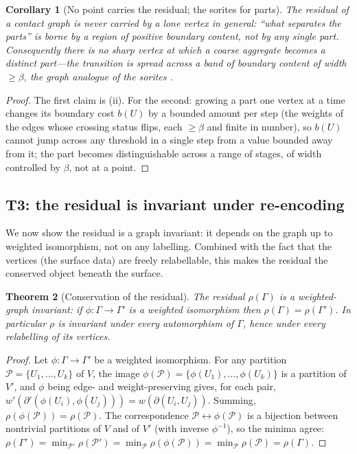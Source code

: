 \documentclass[11pt,a4paper]{article}
\theoremstyle{thmstyle}
\newtheorem{theorem}{Theorem}[section]
\newtheorem{corollary}[theorem]{Corollary}
\theoremstyle{definition}
\theoremstyle{remark}
\newcommand{\Gph}{\Gamma}                 %
\newcommand{\V}{V}                        %
\newcommand{\wt}{w}                       %
\newcommand{\floorc}{\beta}               %
\newcommand{\cut}{\partial}               %
\newcommand{\Res}{\rho}                   %
\begin{document}
\begin{corollary}[No point carries the residual; the sorites for parts]
\label{cor:point-forbidden}
The residual of a contact graph is never carried by a lone vertex in general:
``what separates the parts'' is borne by a region of positive boundary content,
not by any single part. Consequently there is no sharp vertex at which a coarse
aggregate becomes a distinct part---the transition is spread across a band of
boundary content of width $\ge\floorc$, the graph analogue of the sorites
\citep{black1937,williamson1994}.
\end{corollary}

\begin{proof}
The first claim is (ii). For the second: growing a
part one vertex at a time changes its boundary cost $b(U)$ by a bounded amount
per step (the weights of the edges whose crossing status flips, each $\ge
\floorc$ and finite in number), so $b(U)$ cannot jump across any threshold in a
single step from a value bounded away from it; the part becomes distinguishable
across a range of stages, of width controlled by $\floorc$, not at a point.
\end{proof}

\subsection{T3: the residual is invariant under re-encoding}

We now show the residual is a graph invariant: it depends on the graph up to
weighted isomorphism, not on any labelling. Combined with the fact that the
vertices (the surface data) are freely relabellable, this makes the residual the
conserved object beneath the surface.

\begin{theorem}[Conservation of the residual]
\label{thm:residual-invariant}
The residual $\Res(\Gph)$ is a weighted-graph invariant: if
$\phi\colon\Gph\to\Gph'$ is a weighted isomorphism then
$\Res(\Gph)=\Res(\Gph')$. In particular $\Res$ is invariant under every
automorphism of $\Gph$, hence under every relabelling of its vertices.
\end{theorem}

\begin{proof}
Let $\phi\colon\Gph\to\Gph'$ be a weighted isomorphism. For any partition
$\mathcal{P}=\{U_1,\dots,U_k\}$ of $\V$, the image
$\phi(\mathcal{P})=\{\phi(U_1),\dots,\phi(U_k)\}$ is a partition of $\V'$, and
$\phi$ being edge- and weight-preserving gives, for each pair,
$\wt'(\cut'(\phi(U_i),\phi(U_j)))=\wt(\cut(U_i,U_j))$. Summing,
$\Res(\phi(\mathcal{P}))=\Res(\mathcal{P})$. The correspondence
$\mathcal{P}\leftrightarrow\phi(\mathcal{P})$ is a bijection between nontrivial
partitions of $\V$ and of $\V'$ (with inverse $\phi^{-1}$), so the minima agree:
$\Res(\Gph')=\min_{\mathcal{P}'}\Res(\mathcal{P}')=
\min_{\mathcal{P}}\Res(\phi(\mathcal{P}))=\min_{\mathcal{P}}\Res(\mathcal{P})=
\Res(\Gph)$.
\end{proof}
\end{document}
